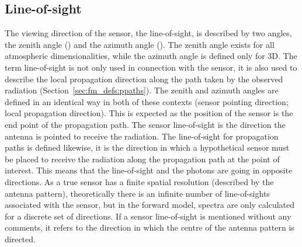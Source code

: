 \subsection{Line-of-sight}
\label{sec:fm_defs:los}

The viewing direction of the sensor, the line-of-sight, is described
by two angles, the zenith angle (\ZntAng) and the azimuth angle
(\AzmAng). The zenith angle exists for all atmospheric
dimensionalities, while the azimuth angle is defined only for 3D.
The term line-of-sight is not only used in connection with the sensor,
it is also used to describe the local propagation direction along the
path taken by the observed radiation
(Section~\ref{sec:fm_defs:ppaths}).  The zenith and azimuth angles
are defined in an identical way in both of these contexts (sensor
pointing direction; local propagation direction). This is expected as
the position of the sensor is the end point of the propagation path.
The sensor line-of-sight is the direction the antenna is pointed to
receive the radiation. The line-of-sight for propagation paths is
defined likewise, it is the direction in which a hypothetical sensor
must be placed to receive the radiation along the propagation path at
the point of interest. This means that the line-of-sight and the
photons are going in opposite directions. As a true sensor has a
finite spatial resolution (described by the antenna pattern),
theoretically there is an infinite number of line-of-sights associated
with the sensor, but in the forward model, spectra are only calculated
for a discrete set of directions. If a sensor line-of-sight is
mentioned without any comments, it refers to the direction in which
the centre of the antenna pattern is directed.

